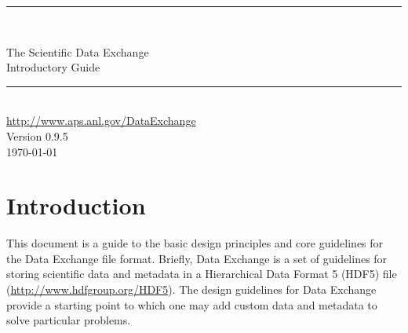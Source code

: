 \documentclass[usletter,11pt]{article}
\newcommand{\HRule}{{\color{brightOrange} \rule{\linewidth}{0.5mm}}}
\begin{document}
\pagestyle{empty}

\begin{center}
\vspace*{2.5cm}

\HRule \\[0.6cm]
\begin{spacing}{2.0}

{\color{softBlue} \Huge \sffamily The Scientific Data Exchange}\\[0.15cm]
{\color{softBlue} \Huge \sffamily Introductory Guide}\\[0.15cm]
\end{spacing}
\HRule \\[1.0cm]
{\Large \color{softBlue} \sffamily \url{http://www.aps.anl.gov/DataExchange}}\\[1.0cm]
{\Large \color{softBlue} \sffamily Version 0.9.5}\\[1.0cm]
{\Large \color{softBlue} \sffamily \today}

\end{center}
\newpage


\newpage

\pagestyle{fancy}

\tableofcontents

\newpage

\setcounter{page}{1}

\section{Introduction}

This document is a guide to the basic design principles and core guidelines
for the Data Exchange file format. Briefly, Data Exchange is a set of
guidelines for storing scientific data and metadata in a Hierarchical Data
Format 5 (HDF5) file (\url{http://www.hdfgroup.org/HDF5}). The design
guidelines for Data Exchange provide a starting point to which one
may add custom data and metadata to solve particular problems. 
\end{document}
